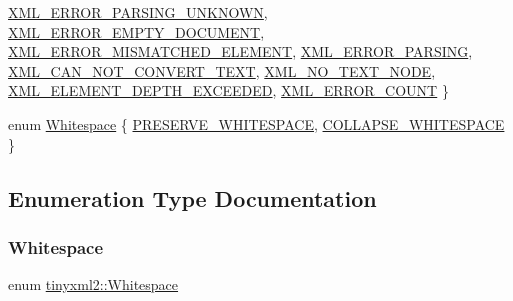 \begin{DoxyCompactItemize}
\newline
\mbox{\hyperlink{namespacetinyxml2_a1fbf88509c3ac88c09117b1947414e08a95a88813812a680fb7372f0149420a97}{X\+M\+L\+\_\+\+E\+R\+R\+O\+R\+\_\+\+P\+A\+R\+S\+I\+N\+G\+\_\+\+U\+N\+K\+N\+O\+WN}}, 
\mbox{\hyperlink{namespacetinyxml2_a1fbf88509c3ac88c09117b1947414e08a1a0478cf44f0a733aa6f21bdf0db80b5}{X\+M\+L\+\_\+\+E\+R\+R\+O\+R\+\_\+\+E\+M\+P\+T\+Y\+\_\+\+D\+O\+C\+U\+M\+E\+NT}}, 
\mbox{\hyperlink{namespacetinyxml2_a1fbf88509c3ac88c09117b1947414e08a0cecc816939d9155d33b8a88fd50e4c1}{X\+M\+L\+\_\+\+E\+R\+R\+O\+R\+\_\+\+M\+I\+S\+M\+A\+T\+C\+H\+E\+D\+\_\+\+E\+L\+E\+M\+E\+NT}}, 
\mbox{\hyperlink{namespacetinyxml2_a1fbf88509c3ac88c09117b1947414e08af6b4caa10e1f2e9f19a3a24f5f3ce223}{X\+M\+L\+\_\+\+E\+R\+R\+O\+R\+\_\+\+P\+A\+R\+S\+I\+NG}}, 
\newline
\mbox{\hyperlink{namespacetinyxml2_a1fbf88509c3ac88c09117b1947414e08afdb8840395a7c13dfe6a3e104401c095}{X\+M\+L\+\_\+\+C\+A\+N\+\_\+\+N\+O\+T\+\_\+\+C\+O\+N\+V\+E\+R\+T\+\_\+\+T\+E\+XT}}, 
\mbox{\hyperlink{namespacetinyxml2_a1fbf88509c3ac88c09117b1947414e08a5300bec98feccc8f0cdf567b88821f33}{X\+M\+L\+\_\+\+N\+O\+\_\+\+T\+E\+X\+T\+\_\+\+N\+O\+DE}}, 
\mbox{\hyperlink{namespacetinyxml2_a1fbf88509c3ac88c09117b1947414e08a0e0d5f9b6c5add26e910d206f469dd21}{X\+M\+L\+\_\+\+E\+L\+E\+M\+E\+N\+T\+\_\+\+D\+E\+P\+T\+H\+\_\+\+E\+X\+C\+E\+E\+D\+ED}}, 
\mbox{\hyperlink{namespacetinyxml2_a1fbf88509c3ac88c09117b1947414e08a9ebb2775c56387353f5b2de94f6ab71d}{X\+M\+L\+\_\+\+E\+R\+R\+O\+R\+\_\+\+C\+O\+U\+NT}}
 \}
\item 
enum \mbox{\hyperlink{namespacetinyxml2_a7f91d00f77360f850fd5da0861e27dd5}{Whitespace}} \{ \mbox{\hyperlink{namespacetinyxml2_a7f91d00f77360f850fd5da0861e27dd5a751769aa625fe5fe5286e9779edec56a}{P\+R\+E\+S\+E\+R\+V\+E\+\_\+\+W\+H\+I\+T\+E\+S\+P\+A\+CE}}, 
\mbox{\hyperlink{namespacetinyxml2_a7f91d00f77360f850fd5da0861e27dd5a9a4a309029a6f5e636e20ef5e0b65136}{C\+O\+L\+L\+A\+P\+S\+E\+\_\+\+W\+H\+I\+T\+E\+S\+P\+A\+CE}}
 \}
\end{DoxyCompactItemize}


\subsection{Enumeration Type Documentation}
\mbox{\label{namespacetinyxml2_a7f91d00f77360f850fd5da0861e27dd5}} 
\subsubsection{\texorpdfstring{Whitespace}{Whitespace}}
{\footnotesize\ttfamily enum \mbox{\hyperlink{namespacetinyxml2_a7f91d00f77360f850fd5da0861e27dd5}{tinyxml2\+::\+Whitespace}}}

